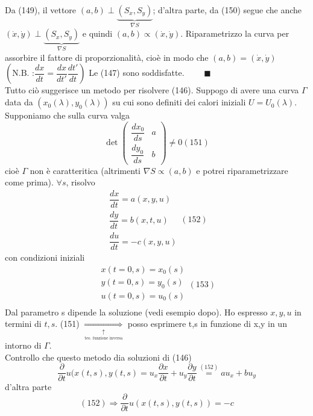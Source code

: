 \documentclass[a4paper,11pt]{report}
\begin{document}
Da (149), il vettore $(a,b) \perp \underset{\nabla S}{\underbrace{(S_x,S_y)}}$; d'altra parte, da (150) segue che anche $(\dot{x},\dot{y}) \perp \underset{\nabla S}{\underbrace{(S_x,S_y)}}$ e quindi $(a,b)\propto (\dot{x},\dot{y})$. Riparametrizzo la curva per assorbire il fattore di proporzionalità, cioè in modo che $(a,b)=(\dot{x},\dot{y})$ $\left( \text{N.B. :} \dfrac{dx}{dt}=\dfrac{dx}{dt'}\dfrac{dt'}{dt}\right)$
Le (147) sono soddisfatte. $\qquad \blacksquare$\\
Tutto ciò suggerisce un metodo per risolvere (146). Suppogo di avere una curva $\Gamma$ data da $(x_0(\lambda),y_0(\lambda))$ su cui sono definiti dei calori iniziali $U=U_0(\lambda)$. Supponiamo che sulla curva valga
\begin{equation}
\det \left(\begin{matrix}
\dfrac{dx_0}{ds} & a \\
\dfrac{dy_0}{ds} & b
\end{matrix}\right)\neq 0(151)
\end{equation}
cioè $\Gamma$ non è caratteritica (altrimenti $\nabla S \propto (a,b)$ e potrei riparametrizzare come prima). $\forall s$, risolvo 
\begin{equation}
\begin{matrix}
\dfrac{dx}{dt}=a(x,y,u) \\
\dfrac{dy}{dt}=b(x,t,u) \\
\dfrac{du}{dt}=-c(x,y,u)
\end{matrix} (152)
\end{equation}
con condizioni iniziali
\begin{equation}
\begin{matrix}
x(t=0,s)=x_0(s) \\
y(t=0,s)=y_0(s) \\
u(t=0,s)=u_0(s) \\
\end{matrix} (153)
\end{equation}
Dal parametro s dipende la soluzione (vedi esempio dopo). Ho espresso $x,y,u$ in termini di $t,s$.
(151) $\underset{\underset{\text{teo. funzione inversa}}{\uparrow}}{\Rightarrow}$ posso esprimere  t,s in funzione di x,y in un intorno di $\Gamma$.\\
Controllo che questo metodo dia soluzioni di (146)
$$
\dfrac{\partial}{\partial t}u(x(t,s),y(t,s)=u_x \dfrac{\partial x}{\partial t} + u_y \dfrac{\partial y}{\partial t}\overset{(152)}{=}au_x + bu_y
$$
d'altra parte
$$
(152) \Rightarrow  \dfrac{\partial }{\partial t} u(x(t,s),y(t,s))=-c
$$
\end{document}
